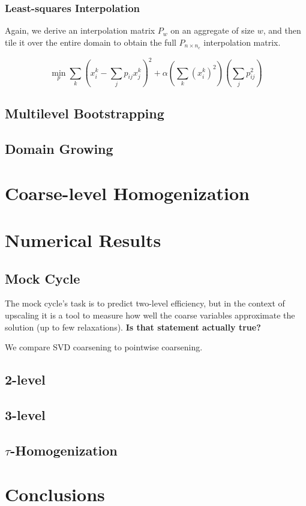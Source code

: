 \documentclass{article}
\begin{document}
\subsubsection{Least-squares Interpolation}
Again, we derive an interpolation matrix $P_w$ on an aggregate of size $w$, and then tile it over the entire domain to obtain the full $P_{n \times n_c}$ interpolation matrix.

\begin{equation}
	\min_p \sum_k \left( x^k_i - \sum_j p_{ij} x^k_j \right)^2 + \alpha \left( \sum_k (x^k_i)^2 \right) \left(\sum_j p_{ij}^2\right) 
\end{equation}

\subsection{Multilevel Bootstrapping}

\subsection{Domain Growing}

\section{Coarse-level Homogenization}


\section{Numerical Results}

\subsection{Mock Cycle}
\label{mock_cycle}
The mock cycle's task is to predict two-level efficiency, but in the context of upscaling it is a tool to measure how well the coarse variables approximate the solution (up to few relaxations). \textbf{Is that statement actually true?}

We compare SVD coarsening to pointwise coarsening.

\subsection{2-level}

\subsection{3-level}

\subsection{$\tau$-Homogenization}

\section{Conclusions}





\end{document}

